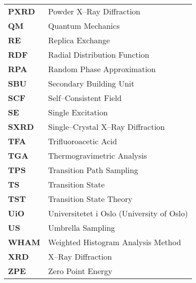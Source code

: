 \begin{longtable}{p{} p{}}
\textbf{PXRD} & Powder X--Ray Diffraction\\
\textbf{QM} & Quantum Mechanics \\
\textbf{RE} & Replica Exchange \\
\textbf{RDF} & Radial Distribution Function \\
\textbf{RPA} & Random Phase Approximation \\
\textbf{SBU} & Secondary Building Unit \\
\textbf{SCF} & Self--Consistent Field\\
\textbf{SE} & Single Excitation\\
\textbf{SXRD} & Single--Crystal X--Ray Diffraction\\
\textbf{TFA} & Trifluoroacetic Acid\\
\textbf{TGA} & Thermogravimetric Analysis\\
\textbf{TPS} & Transition Path Sampling  \\
\textbf{TS}  & Transition State \\
\textbf{TST} & Transition State Theory  \\
\textbf{UiO} & Universitetet i Oslo (University of Oslo) \\ 
\textbf{US} & Umbrella Sampling  \\
\textbf{WHAM} & Weighted Histogram Analysis Method \\
\textbf{XRD} & X--Ray Diffraction\\
\textbf{ZPE} & Zero Point Energy\\
\end{longtable}